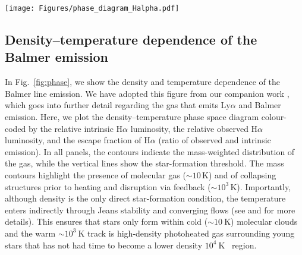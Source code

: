 \documentclass[fleqn,usenatbib]{mnras}
\newcommand\HII{\ion{H}{II}~} %
\begin{document}
\begin{figure*}
\begin{center}
\texttt{[image: Figures/phase\_diagram\_Halpha.pdf]}
\caption{Density and temperature dependence of the Balmer H$\alpha$ line emission across all snapshots of the MW simulation. From left to right, we plot the density--temperature phase space diagram colour-coded by the relative intrinsic H$\alpha$ luminosity, the relative observed H$\alpha$ luminosity, and the escape fraction of H$\alpha$ (ratio of observed and intrinsic emission). The contours indicate the mass-weighted distribution of the gas, while the vertical lines show the star-formation threshold. Most of the intrinsic H$\alpha$ emission comes from dense \HII regions with a characteristic temperature of $T\sim 10^3$--$10^4\,\mathrm{K}$, while the observed H$\alpha$ emission stems from $T\sim 10^4\,\mathrm{K}$ gas. The impact of dust absorption can also be seen: the denser the gas, the more pronounced the dust absorption and hence the lower the escape fraction.}
\label{fig:phase}
\end{center}
\end{figure*}


\subsection{Density--temperature dependence of the Balmer emission}
\label{subsec:phase}

In Fig.~\ref{fig:phase}, we show the density and temperature dependence of the Balmer line emission. We have adopted this figure from our companion work \citep{smith21_rt}, which goes into further detail regarding the gas that emits Ly$\alpha$ and Balmer emission. Here, we plot the density--temperature phase space diagram colour-coded by the relative intrinsic H$\alpha$ luminosity, the relative observed H$\alpha$ luminosity, and the escape fraction of H$\alpha$ (ratio of observed and intrinsic emission). In all panels, the contours indicate the mass-weighted distribution of the gas, while the vertical lines show the star-formation threshold. The mass contours highlight the presence of molecular gas ($\sim 10\,\mathrm{K}$) and of collapsing structures prior to heating and disruption via feedback ($\sim 10^3\,\mathrm{K}$). Importantly, although density is the only direct star-formation condition, the temperature enters indirectly through Jeans stability and  converging flows (see \citealt{marinacci19} and \citealt{kannan20_mw} for more details). This ensures that stars only form within cold ($\sim10~\mathrm{K}$) molecular clouds and the warm $\sim10^3~\mathrm{K}$ track is high-density photoheated gas surrounding young stars that has not had time to become a lower density $10^4~\mathrm{K}$ \HII region.
\end{document}
